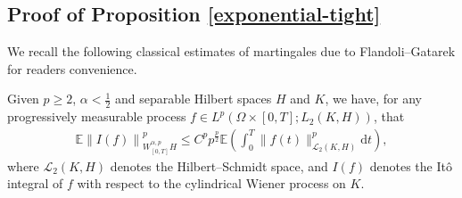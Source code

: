 \subsection{Proof of Proposition \ref{exponential-tight}}We recall the following classical estimates of martingales due to Flandoli--Gatarek \cite{} for readers convenience. 
\begin{lem}Given $p \ge 2$, $\alpha < \tfrac{1}{2}$ and separable Hilbert spaces $H$ and $K$, we have, for any progressively measurable process 
$f \in L^p(\Omega \times [0,T]; L_2(K,H))$, that
\begin{align}\label{eq:FlandoliGatarek}
\mathbb{E}\left\|I(f)\right\|_{W^{\alpha,p}_{[0,T]}H}^p 
\leq C^p p^{\frac{p}{2}}  \mathbb{E} \left( \int_0^T \|f(t)\|_{\mathcal{L}_2(K,H)}^p \mathrm{d}t\right),
\end{align}
where $\mathcal{L}_2(K,H)$ denotes the Hilbert--Schmidt space, and $I(f)$ denotes the It\^o integral of $f$ with respect to the cylindrical Wiener process on $K$.
\end{lem}





